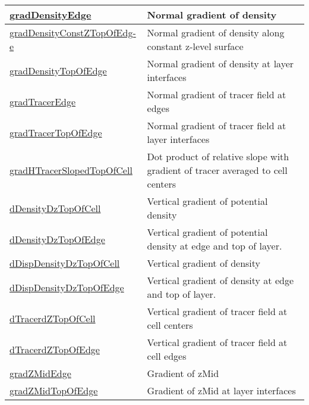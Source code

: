 {\begin{center}
\begin{longtable}{| p{2.0in} | p{4.0in} |}
    \hline
    \hyperref[subsec:var_sec_scratch_gradDensityEdge]{gradDensityEdge} & Normal gradient of density \\
    \hline
    \hyperref[subsec:var_sec_scratch_gradDensityConstZTopOfEdge]{gradDensityConstZTopOfEdg-}\hyperref[subsec:var_sec_scratch_gradDensityConstZTopOfEdge]{e  }& Normal gradient of density along constant z-level surface \\
    \hline
    \hyperref[subsec:var_sec_scratch_gradDensityTopOfEdge]{gradDensityTopOfEdge} & Normal gradient of density at layer interfaces \\
    \hline
    \hyperref[subsec:var_sec_scratch_gradTracerEdge]{gradTracerEdge} & Normal gradient of tracer field at edges \\
    \hline
    \hyperref[subsec:var_sec_scratch_gradTracerTopOfEdge]{gradTracerTopOfEdge} & Normal gradient of tracer field at layer interfaces \\
    \hline
    \hyperref[subsec:var_sec_scratch_gradHTracerSlopedTopOfCell]{gradHTracerSlopedTopOfCell} & Dot product of relative slope with gradient of tracer averaged to cell centers \\
    \hline
    \hyperref[subsec:var_sec_scratch_dDensityDzTopOfCell]{dDensityDzTopOfCell} & Vertical gradient of potential density \\
    \hline
    \hyperref[subsec:var_sec_scratch_dDensityDzTopOfEdge]{dDensityDzTopOfEdge} & Vertical gradient of potential density at edge and top of layer. \\
    \hline
    \hyperref[subsec:var_sec_scratch_dDispDensityDzTopOfCell]{dDispDensityDzTopOfCell} & Vertical gradient of density \\
    \hline
    \hyperref[subsec:var_sec_scratch_dDispDensityDzTopOfEdge]{dDispDensityDzTopOfEdge} & Vertical gradient of density at edge and top of layer. \\
    \hline
    \hyperref[subsec:var_sec_scratch_dTracerdZTopOfCell]{dTracerdZTopOfCell} & Vertical gradient of tracer field at cell centers \\
    \hline
    \hyperref[subsec:var_sec_scratch_dTracerdZTopOfEdge]{dTracerdZTopOfEdge} & Vertical gradient of tracer field at cell edges \\
    \hline
    \hyperref[subsec:var_sec_scratch_gradZMidEdge]{gradZMidEdge} & Gradient of zMid \\
    \hline
    \hyperref[subsec:var_sec_scratch_gradZMidTopOfEdge]{gradZMidTopOfEdge} & Gradient of zMid at layer interfaces \\

\end{longtable}
\end{center}}
